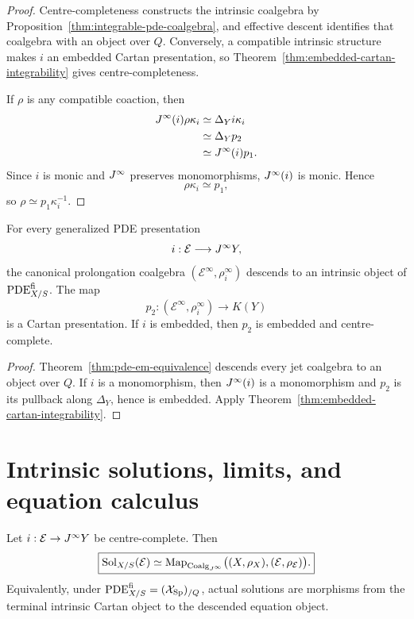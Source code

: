 \begin{proof}
Centre-completeness constructs the intrinsic coalgebra by Proposition~\ref{thm:integrable-pde-coalgebra}, and effective descent identifies that coalgebra with an object over $Q$.  Conversely, a compatible intrinsic structure makes $i$ an embedded Cartan presentation, so Theorem~\ref{thm:embedded-cartan-integrability} gives centre-completeness.

If $\rho$ is any compatible coaction, then
\[
\begin{aligned}
J^{\infty}(i)\rho\kappa_i
&\simeq
\Delta_Yi\kappa_i\\
&\simeq
\Delta_Yp_2\\
&\simeq
J^{\infty}(i)p_1.
\end{aligned}
\]
Since $i$ is monic and $J^{\infty}$ preserves monomorphisms, $J^{\infty}(i)$ is monic.  Hence
\[
    \rho\kappa_i\simeq p_1,
\]
so $\rho\simeq p_1\kappa_i^{-1}$.
\end{proof}

\begin{corollary}
\label{cor:cartan-prolongation-integrability}
For every generalized PDE presentation
\[
    i:\mathcal E\longrightarrow J^{\infty} Y,
\]
the canonical prolongation coalgebra $(\mathcal E^\infty,\rho_i^\infty)$ descends to an intrinsic object of $\operatorname{PDE}^{\mathrm{fi}}_{X/S}$.  The map
\[
    p_2:(\mathcal E^\infty,\rho_i^\infty)\longrightarrow K(Y)
\]
is a Cartan presentation.  If $i$ is embedded, then $p_2$ is embedded and centre-complete.
\end{corollary}

\begin{proof}
Theorem~\ref{thm:pde-em-equivalence} descends every jet coalgebra to an object over $Q$.  If $i$ is a monomorphism, then $J^{\infty}(i)$ is a monomorphism and $p_2$ is its pullback along $\Delta_Y$, hence is embedded.  Apply Theorem~\ref{thm:embedded-cartan-integrability}.
\end{proof}

\section{Intrinsic solutions, limits, and equation calculus}
\label{sec:pde-finite-limits}

\begin{corollary}
\label{cor:solutions-coalgebra-maps}
Let $i:\mathcal E\to J^{\infty} Y$ be centre-complete.  Then
\[
\boxed{
    \operatorname{Sol}_{X/S}(\mathcal E)
    \simeq
    \operatorname{Map}_{\operatorname{Coalg}_{J^{\infty}}}
    \bigl((X,\rho_X),(\mathcal E,\rho_{\mathcal E})\bigr).
}
\]
Equivalently, under $\operatorname{PDE}^{\mathrm{fi}}_{X/S}=(\mathcal{X}_{\mathrm{Sp}})_{/Q}$, actual solutions are morphisms from the terminal intrinsic Cartan object to the descended equation object.
\end{corollary}

